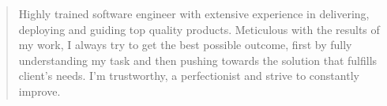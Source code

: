 \begin{quote}
    Highly trained software engineer with extensive experience in delivering, deploying and guiding top quality products. Meticulous with the results of my work, I always try to get the best possible outcome, first by fully understanding my task and then pushing towards the solution that fulfills client's needs. I'm trustworthy, a perfectionist and strive to constantly improve.
\end{quote}